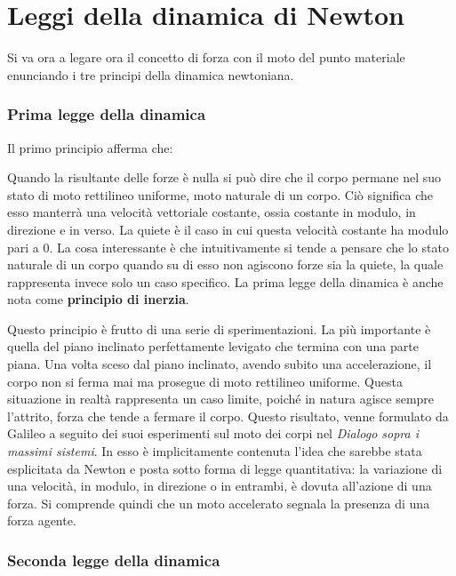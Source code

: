 \section{Leggi della dinamica di Newton}

Si va ora a legare ora il concetto di forza con il moto del punto materiale enunciando i tre principi della dinamica newtoniana.

\subsubsection{Prima legge della dinamica}

Il primo principio afferma che:

\noindent{}

Quando la risultante delle forze è nulla si può dire che il corpo permane nel suo stato di moto rettilineo uniforme, moto naturale di un corpo. Ciò significa che esso manterrà una velocità vettoriale costante, ossia costante in modulo, in direzione e in verso. La quiete è il caso in cui questa velocità costante ha modulo pari a $0$. La cosa interessante è che intuitivamente si tende a pensare che lo stato naturale di un corpo quando su di esso non agiscono forze sia la quiete, la quale rappresenta invece solo un caso specifico. La prima legge della dinamica è anche nota come \textbf{principio di inerzia}.

Questo principio è frutto di una serie di sperimentazioni. La più importante è quella del piano inclinato perfettamente levigato che termina con una parte piana. Una volta sceso dal piano inclinato, avendo subito una accelerazione, il corpo non si ferma mai ma prosegue di moto rettilineo uniforme. Questa situazione in realtà rappresenta un caso limite, poiché in natura agisce sempre l'attrito, forza che tende a fermare il corpo. Questo risultato, venne formulato da Galileo a seguito dei suoi esperimenti sul moto dei corpi nel \textit{Dialogo sopra i massimi sistemi}. In esso è implicitamente contenuta l'idea che sarebbe stata esplicitata da Newton e posta sotto forma di legge quantitativa: la variazione di una velocità, in modulo, in direzione o in entrambi, è dovuta all'azione di una forza. Si comprende quindi che un moto accelerato segnala la presenza di una forza agente.

\subsubsection{Seconda legge della dinamica}

